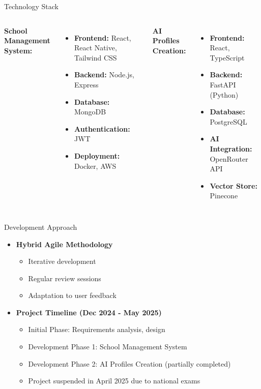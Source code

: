 \documentclass[aspectratio=169]{beamer}
\begin{document}
\begin{frame}{Technology Stack}
    \begin{columns}
        \textbf{School Management System:}
        \begin{itemize}
            \item \textbf{Frontend:} React, React Native, Tailwind CSS
            \item \textbf{Backend:} Node.js, Express
            \item \textbf{Database:} MongoDB
            \item \textbf{Authentication:} JWT
            \item \textbf{Deployment:} Docker, AWS
        \end{itemize}
        \textbf{AI Profiles Creation:}
        \begin{itemize}
            \item \textbf{Frontend:} React, TypeScript
            \item \textbf{Backend:} FastAPI (Python)
            \item \textbf{Database:} PostgreSQL
            \item \textbf{AI Integration:} OpenRouter API
            \item \textbf{Vector Store:} Pinecone
        \end{itemize}
    \end{columns}
\end{frame}

\begin{frame}{Development Approach}
    \begin{itemize}
        \item \textbf{Hybrid Agile Methodology}
        \begin{itemize}
            \item Iterative development
            \item Regular review sessions
            \item Adaptation to user feedback
        \end{itemize}
        \vspace{0.3cm}
        \item \textbf{Project Timeline (Dec 2024 - May 2025)}
        \begin{itemize}
            \item Initial Phase: Requirements analysis, design
            \item Development Phase 1: School Management System
            \item Development Phase 2: AI Profiles Creation (partially completed)
            \item Project suspended in April 2025 due to national exams
        \end{itemize}
    \end{itemize}
\end{frame}
\end{document}
